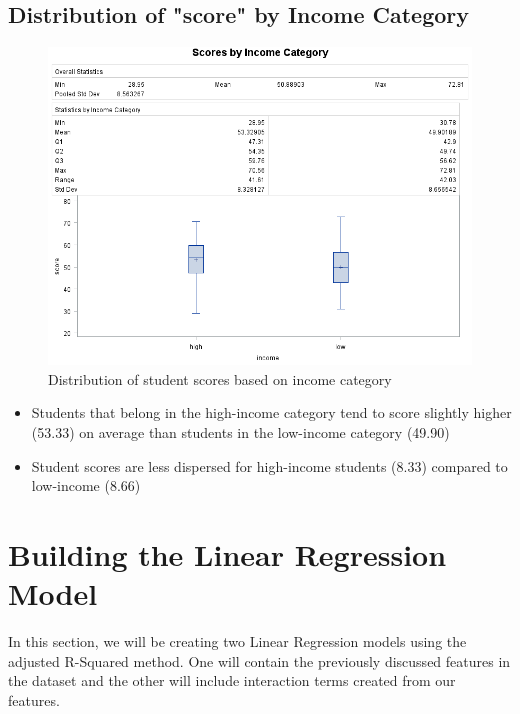 \documentclass[12pt]{article}
\begin{document}
\subsection{Distribution of "score" by Income Category}
\begin{figure}[h]
    \centering
    \includegraphics[width=1.14\textwidth]{images/scores_by_income_cat.png}
    \caption{Distribution of student scores based on income category}
    \label{scores_by_urban}
\end{figure}

\begin{itemize}
    \item Students that belong in the high-income category tend to score slightly higher (53.33) on average than students in the low-income category (49.90)
    \item Student scores are less dispersed for high-income students (8.33) compared to low-income (8.66)
    
\end{itemize}

\newpage

\section{Building the Linear Regression Model}
In this section, we will be creating two Linear Regression models using the adjusted R-Squared method. One will contain the previously discussed features in the dataset and the other will include interaction terms created from our features.
\end{document}
